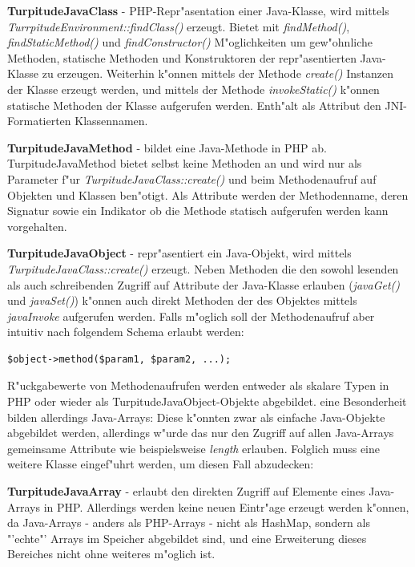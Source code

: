 \textbf{TurpitudeJavaClass} - PHP-Repr"asentation einer Java-Klasse, wird mittels \emph{TurrpitudeEnvironment::findClass()} erzeugt.
Bietet mit \emph{findMethod()}, \emph{findStaticMethod()} und \emph{findConstructor()} M"oglichkeiten um gew"ohnliche Methoden, statische
Methoden und Konstruktoren der repr"asentierten Java-Klasse zu erzeugen. Weiterhin k"onnen mittels der Methode \emph{create()} Instanzen
der Klasse erzeugt werden, und mittels der Methode \emph{invokeStatic()} k"onnen statische Methoden der Klasse aufgerufen werden.
Enth"alt als Attribut den JNI-Formatierten Klassennamen. 

\textbf{TurpitudeJavaMethod} - bildet eine Java-Methode in PHP ab. TurpitudeJavaMethod bietet selbst keine Methoden an und wird nur
als Parameter f"ur \emph{TurpitudeJavaClass::create()} und beim Methodenaufruf auf Objekten und Klassen ben"otigt.
Als Attribute werden der Methodenname, deren Signatur sowie ein Indikator ob die Methode statisch aufgerufen werden kann vorgehalten.

\textbf{TurpitudeJavaObject} - repr"asentiert ein Java-Objekt, wird mittels \emph{TurpitudeJavaClass::create()} erzeugt. Neben Methoden
die den sowohl lesenden als auch schreibenden Zugriff auf Attribute der Java-Klasse erlauben (\emph{javaGet()} und \emph{javaSet()}) k"onnen
auch direkt Methoden der des Objektes mittels \emph{javaInvoke} aufgerufen werden. Falls m"oglich soll der Methodenaufruf aber
intuitiv nach folgendem Schema erlaubt werden:
\begin{lstlisting}[caption=angestrebte Syntax zum Aufruf von Java-Methoden in PHP]
$object->method($param1, $param2, ...);
\end{lstlisting}
R"uckgabewerte von Methodenaufrufen werden entweder als skalare Typen in PHP oder wieder als TurpitudeJavaObject-Objekte abgebildet.
eine Besonderheit bilden allerdings Java-Arrays: Diese k"onnten zwar als einfache Java-Objekte abgebildet werden, allerdings w"urde das 
nur den Zugriff auf allen Java-Arrays gemeinsame Attribute wie beispielsweise \emph{length} erlauben. Folglich muss eine weitere
Klasse eingef"uhrt werden, um diesen Fall abzudecken:

\textbf{TurpitudeJavaArray} - erlaubt den direkten Zugriff auf Elemente eines Java-Arrays in PHP. Allerdings werden keine neuen Eintr"age
erzeugt werden k"onnen, da Java-Arrays - anders als PHP-Arrays - nicht als HashMap, sondern als "'echte"' Arrays im Speicher abgebildet
sind, und eine Erweiterung dieses Bereiches nicht ohne weiteres m"oglich ist.

